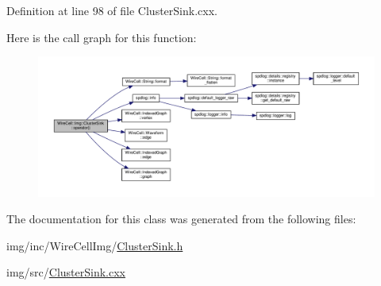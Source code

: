 Definition at line 98 of file Cluster\+Sink.\+cxx.

Here is the call graph for this function\+:
\nopagebreak
\begin{figure}[H]
\begin{center}
\leavevmode
\includegraphics[width=350pt]{class_wire_cell_1_1_img_1_1_cluster_sink_aacf43e19e297947a4dd80e54ee8775f6_cgraph}
\end{center}
\end{figure}


The documentation for this class was generated from the following files\+:\begin{DoxyCompactItemize}
\item 
img/inc/\+Wire\+Cell\+Img/\hyperlink{_cluster_sink_8h}{Cluster\+Sink.\+h}\item 
img/src/\hyperlink{_cluster_sink_8cxx}{Cluster\+Sink.\+cxx}\end{DoxyCompactItemize}

